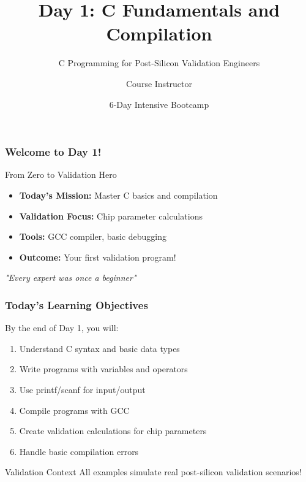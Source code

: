 \documentclass{beamer}
\title{Day 1: C Fundamentals and Compilation}
\subtitle{C Programming for Post-Silicon Validation Engineers}
\author{Course Instructor}
\date{6-Day Intensive Bootcamp}
\institute{Post-Silicon Validation Training Program}
\begin{document}
\frame{\titlepage}

\begin{frame}
\frametitle{Welcome to Day 1!}
\begin{center}
\Large From Zero to Validation Hero
\end{center}

\begin{itemize}
    \item \textbf{Today's Mission:} Master C basics and compilation
    \item \textbf{Validation Focus:} Chip parameter calculations
    \item \textbf{Tools:} GCC compiler, basic debugging
    \item \textbf{Outcome:} Your first validation program!
\end{itemize}

\vspace{0.5cm}
\begin{center}
\textit{"Every expert was once a beginner"}
\end{center}
\end{frame}

\begin{frame}
\frametitle{Today's Learning Objectives}
By the end of Day 1, you will:

\begin{enumerate}
    \item Understand C syntax and basic data types
    \item Write programs with variables and operators
    \item Use printf/scanf for input/output
    \item Compile programs with GCC
    \item Create validation calculations for chip parameters
    \item Handle basic compilation errors
\end{enumerate}

\vspace{0.5cm}
\begin{alertblock}{Validation Context}
All examples simulate real post-silicon validation scenarios!
\end{alertblock}
\end{frame}
\end{document}
